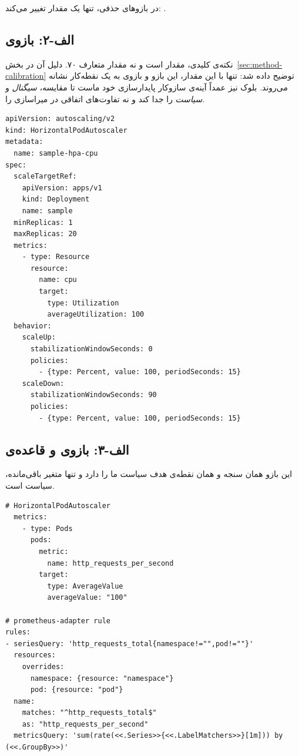 در بازوهای حذفی، تنها یک مقدار تغییر می‌کند: .

\subsection*{الف-۲: بازوی }

نکته‌ی کلیدی، مقدار  است و نه مقدار متعارف ۷۰. دلیل آن در
بخش~\ref{sec:method-calibration} توضیح داده شد: تنها با این مقدار، این بازو و بازوی
 به یک نقطه‌کار نشانه می‌روند. بلوک  نیز عمداً آینه‌ی
سازوکار پایدارسازی خود ماست تا مقایسه، \emph{سیگنال} و \emph{سیاست} را جدا کند و نه
تفاوت‌های اتفاقی در میراسازی را.

\begin{latin}
\begin{lstlisting}[language=yamlx]
apiVersion: autoscaling/v2
kind: HorizontalPodAutoscaler
metadata:
  name: sample-hpa-cpu
spec:
  scaleTargetRef:
    apiVersion: apps/v1
    kind: Deployment
    name: sample
  minReplicas: 1
  maxReplicas: 20
  metrics:
    - type: Resource
      resource:
        name: cpu
        target:
          type: Utilization
          averageUtilization: 100
  behavior:
    scaleUp:
      stabilizationWindowSeconds: 0
      policies:
        - {type: Percent, value: 100, periodSeconds: 15}
    scaleDown:
      stabilizationWindowSeconds: 90
      policies:
        - {type: Percent, value: 100, periodSeconds: 15}
\end{lstlisting}
\end{latin}

\subsection*{الف-۳: بازوی  و قاعده‌ی }

این بازو همان سنجه و همان نقطه‌ی هدف سیاست ما را دارد و تنها متغیر باقی‌مانده، سیاست است.

\begin{latin}
\begin{lstlisting}[language=yamlx]
# HorizontalPodAutoscaler
  metrics:
    - type: Pods
      pods:
        metric:
          name: http_requests_per_second
        target:
          type: AverageValue
          averageValue: "100"

# prometheus-adapter rule
rules:
- seriesQuery: 'http_requests_total{namespace!="",pod!=""}'
  resources:
    overrides:
      namespace: {resource: "namespace"}
      pod: {resource: "pod"}
  name:
    matches: "^http_requests_total$"
    as: "http_requests_per_second"
  metricsQuery: 'sum(rate(<<.Series>>{<<.LabelMatchers>>}[1m])) by (<<.GroupBy>>)'
\end{lstlisting}
\end{latin}

